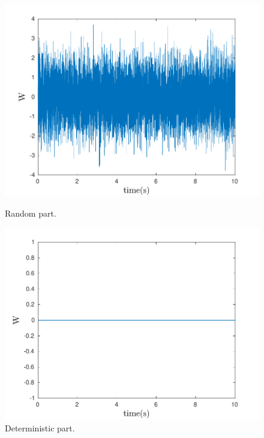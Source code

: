 \documentclass{article}
\begin{document}
\begin{figure}[H]
  \centering
  \begin{minipage}[b]{0.45\textwidth}
    \includegraphics[width=\textwidth]{fig5}
	\caption{Random part.}
  \end{minipage}
  \hfill
  \begin{minipage}[b]{0.45\textwidth}
    \includegraphics[width=\textwidth]{fig10}
	\caption{Deterministic part.}
  \end{minipage}
\end{figure}
\end{document}
